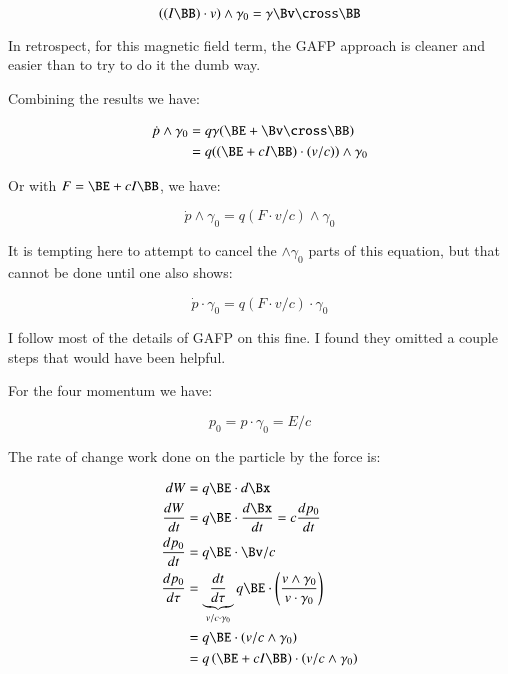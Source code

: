 \begin{equation*}
((I\BB) \cdot v) \wedge \gamma_0 = \gamma \Bv \cross \BB
\end{equation*}

In retrospect, for this magnetic field term, the GAFP approach is cleaner and easier than to try to do it the dumb way.

Combining the results we have:

\begin{align*}
\dot{p} \wedge \gamma_0
&= q \gamma ( \BE + \Bv \cross \BB ) \\
&= q (( \BE + c I \BB ) \cdot (v/c)) \wedge \gamma_0 \\
\end{align*}

Or with $F = \BE + c I \BB$, we have:

\begin{equation}\label{eqn:gafpLor:pvec}
\dot{p} \wedge \gamma_0 = q ( F \cdot v/c ) \wedge \gamma_0
\end{equation}

It is tempting here to attempt to cancel the $\wedge \gamma_0$ parts of this equation, but that cannot be done
until one also shows:

\begin{equation*}
\dot{p} \cdot \gamma_0 = q ( F \cdot v/c ) \cdot \gamma_0
\end{equation*}

I follow most of the details of GAFP on this fine.  I found they omitted a couple steps that would have been helpful.

For the four momentum we have:

\begin{equation*}
p_0 = p \cdot \gamma_0 = E/c
\end{equation*}

The rate of change work done on the particle by the force is:

\begin{align*}
dW &= q\BE \cdot d\Bx \\
\frac{dW}{dt} &= q\BE \cdot \frac{d\Bx}{dt} = c \frac{dp_0}{dt} \\
\frac{dp_0}{dt} &= q\BE \cdot \Bv/c \\
\frac{dp_0}{d\tau} &= \underbrace{\frac{dt}{d\tau}}_{v/c \cdot \gamma_0} q\BE \cdot \left( \frac{v \wedge \gamma_0}{v \cdot \gamma_0} \right) \\
                   &= q\BE \cdot \left(v/c \wedge \gamma_0\right) \\
                   &= q \left(\BE + c I \BB\right) \cdot \left(v/c \wedge \gamma_0\right) \\
\end{align*}

